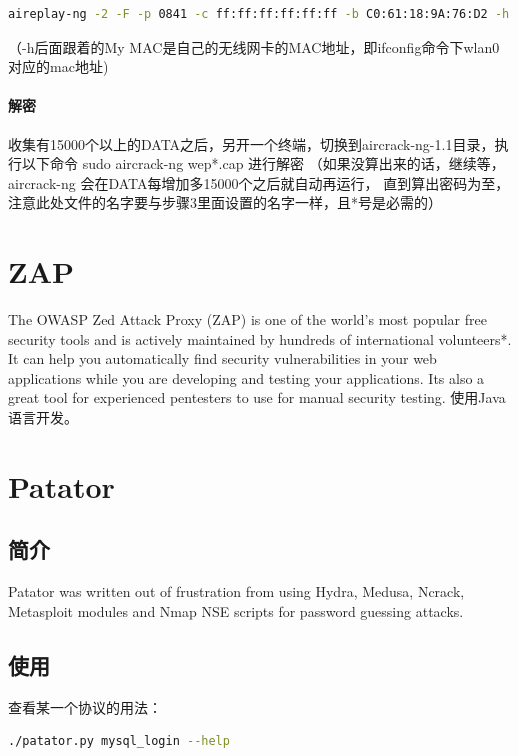 \documentclass{book}
\begin{document}
\begin{lstlisting}[language=Bash]
aireplay-ng -2 -F -p 0841 -c ff:ff:ff:ff:ff:ff -b C0:61:18:9A:76:D2 -h 00:25:d3:9a:b6:01 mon0
\end{lstlisting}


（-h后面跟着的My MAC是自己的无线网卡的MAC地址，即ifconfig命令下wlan0对应的mac地址)

\paragraph{解密}
收集有15000个以上的DATA之后，另开一个终端，切换到aircrack-ng-1.1目录，执行以下命令
sudo aircrack-ng wep*.cap
进行解密
（如果没算出来的话，继续等，aircrack-ng 会在DATA每增加多15000个之后就自动再运行，
直到算出密码为至，注意此处文件的名字要与步骤3里面设置的名字一样，且*号是必需的）

\section{ZAP}

The OWASP Zed Attack Proxy (ZAP) is one of the world’s most popular free security tools 
and is actively maintained by hundreds of international volunteers*. 
It can help you automatically find security vulnerabilities in your web 
applications while you are developing and testing your applications. 
Its also a great tool for experienced pentesters to use for manual security testing.
使用Java语言开发。

\section{Patator}

\subsection{简介}

Patator was written out of frustration from using Hydra, 
Medusa, Ncrack, Metasploit modules and Nmap NSE scripts for password guessing attacks. 

\subsection{使用}

查看某一个协议的用法：

\begin{lstlisting}[language=Bash]
./patator.py mysql_login --help
\end{lstlisting}
\end{document}
